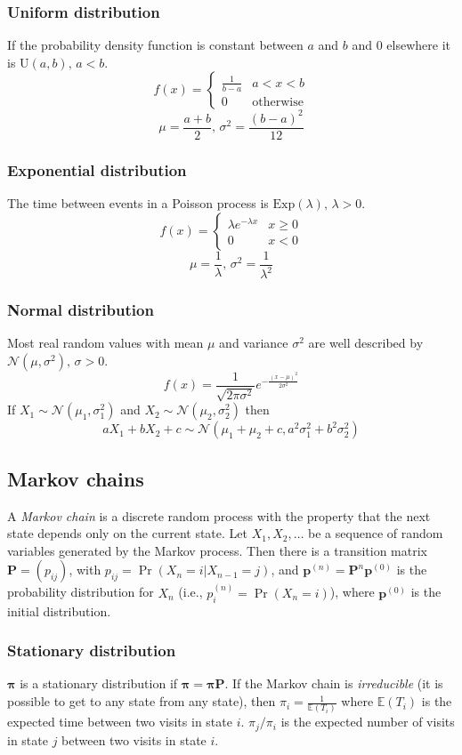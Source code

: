 \subsubsection{Uniform distribution}
If the probability density function is constant between $a$ and $b$ and 0 elsewhere it is $\textrm{U}(a,b),\,a<b$.
\[f(x) = \left\{
\begin{array}{cl}
\frac{1}{b-a} & a<x<b\\
0 & \textrm{otherwise}
\end{array}\right.\]
\[\mu=\frac{a+b}{2},\,\sigma^2=\frac{(b-a)^2}{12}\]

\subsubsection{Exponential distribution}
The time between events in a Poisson process is $\textrm{Exp}(\lambda),\,\lambda>0$.
\[f(x) = \left\{
\begin{array}{cl}
\lambda e^{-\lambda x} & x\geq0\\
0 & x<0
\end{array}\right.\]
\[\mu=\frac{1}{\lambda},\,\sigma^2=\frac{1}{\lambda^2}\]

\subsubsection{Normal distribution}
Most real random values with mean $\mu$ and variance $\sigma^2$ are well described by $\mathcal{N}(\mu,\sigma^2),\,\sigma>0$.
\[ f(x) = \frac{1}{\sqrt{2\pi\sigma^2}}e^{-\frac{(x-\mu)^2}{2\sigma^2}} \]
If $X_1 \sim \mathcal{N}(\mu_1,\sigma_1^2)$ and $X_2 \sim \mathcal{N}(\mu_2,\sigma_2^2)$ then
\[ aX_1 + bX_2 + c \sim \mathcal{N}(\mu_1+\mu_2+c,a^2\sigma_1^2+b^2\sigma_2^2) \]

\subsection{Markov chains}
A \emph{Markov chain} is a discrete random process with the property that the next state depends only on the current state.
Let $X_1,X_2,\ldots$ be a sequence of random variables generated by the Markov process.
Then there is a transition matrix $\mathbf{P} = (p_{ij})$, with $p_{ij} = \Pr(X_n = i | X_{n-1} = j)$,
and $\mathbf{p}^{(n)} = \mathbf P^n \mathbf p^{(0)}$ is the probability distribution for $X_n$ (i.e., $p^{(n)}_i = \Pr(X_n = i)$),
where $\mathbf{p}^{(0)}$ is the initial distribution.

\subsubsection{Stationary distribution}
$\mathbf{\pi}$ is a stationary distribution if $\mathbf{\pi} = \mathbf{\pi P}$.
If the Markov chain is \emph{irreducible} (it is possible to get to any state from any state),
then $\pi_i = \frac{1}{\mathbb{E}(T_i)}$ where $\mathbb{E}(T_i)$  is the expected time between two visits in state $i$.
$\pi_j/\pi_i$ is the expected number of visits in state $j$ between two visits in state $i$.

